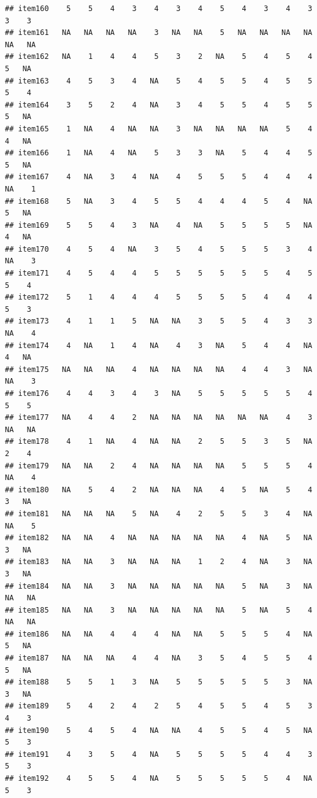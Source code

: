 \documentclass[
  man]{apa6}
\begin{document}
\begin{verbatim}
## item160    5    5    4    3    4    3    4    5    4    3    4    3    3    3
## item161   NA   NA   NA   NA    3   NA   NA    5   NA   NA   NA   NA   NA   NA
## item162   NA    1    4    4    5    3    2   NA    5    4    5    4    5   NA
## item163    4    5    3    4   NA    5    4    5    5    4    5    5    5    4
## item164    3    5    2    4   NA    3    4    5    5    4    5    5    5   NA
## item165    1   NA    4   NA   NA    3   NA   NA   NA   NA    5    4    4   NA
## item166    1   NA    4   NA    5    3    3   NA    5    4    4    5    5   NA
## item167    4   NA    3    4   NA    4    5    5    5    4    4    4   NA    1
## item168    5   NA    3    4    5    5    4    4    4    5    4   NA    5   NA
## item169    5    5    4    3   NA    4   NA    5    5    5    5   NA    4   NA
## item170    4    5    4   NA    3    5    4    5    5    5    3    4   NA    3
## item171    4    5    4    4    5    5    5    5    5    5    4    5    5    4
## item172    5    1    4    4    4    5    5    5    5    4    4    4    5    3
## item173    4    1    1    5   NA   NA    3    5    5    4    3    3   NA    4
## item174    4   NA    1    4   NA    4    3   NA    5    4    4   NA    4   NA
## item175   NA   NA   NA    4   NA   NA   NA   NA    4    4    3   NA   NA    3
## item176    4    4    3    4    3   NA    5    5    5    5    5    4    5    5
## item177   NA    4    4    2   NA   NA   NA   NA   NA   NA    4    3   NA   NA
## item178    4    1   NA    4   NA   NA    2    5    5    3    5   NA    2    4
## item179   NA   NA    2    4   NA   NA   NA   NA    5    5    5    4   NA    4
## item180   NA    5    4    2   NA   NA   NA    4    5   NA    5    4    3   NA
## item181   NA   NA   NA    5   NA    4    2    5    5    3    4   NA   NA    5
## item182   NA   NA    4   NA   NA   NA   NA   NA    4   NA    5   NA    3   NA
## item183   NA   NA    3   NA   NA   NA    1    2    4   NA    3   NA    3   NA
## item184   NA   NA    3   NA   NA   NA   NA   NA    5   NA    3   NA   NA   NA
## item185   NA   NA    3   NA   NA   NA   NA   NA    5   NA    5    4   NA   NA
## item186   NA   NA    4    4    4   NA   NA    5    5    5    4   NA    5   NA
## item187   NA   NA   NA    4    4   NA    3    5    4    5    5    4    5   NA
## item188    5    5    1    3   NA    5    5    5    5    5    3   NA    3   NA
## item189    5    4    2    4    2    5    4    5    5    4    5    3    4    3
## item190    5    4    5    4   NA   NA    4    5    5    4    5   NA    5    3
## item191    4    3    5    4   NA    5    5    5    5    4    4    3    5    3
## item192    4    5    5    4   NA    5    5    5    5    5    4   NA    5    3

\end{verbatim}
\end{document}
